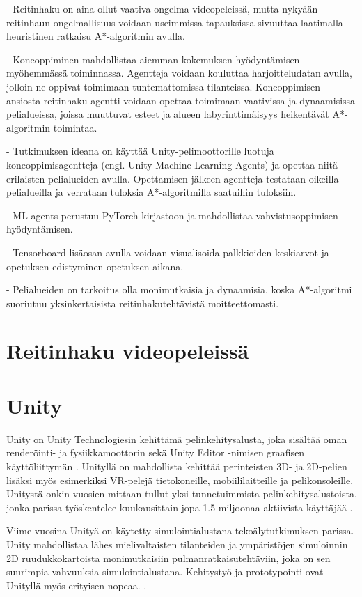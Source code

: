 \documentclass[utf8]{gradu3}
\begin{document}
- Reitinhaku on aina ollut vaativa ongelma videopeleissä, mutta nykyään reitinhaun ongelmallisuus voidaan
useimmissa tapauksissa sivuuttaa laatimalla heuristinen ratkaisu A*-algoritmin avulla.

- Koneoppiminen mahdollistaa aiemman kokemuksen hyödyntämisen myöhemmässä toiminnassa.
Agentteja voidaan kouluttaa harjoitteludatan avulla, jolloin ne oppivat toimimaan tuntemattomissa tilanteissa.
Koneoppimisen ansiosta reitinhaku-agentti voidaan opettaa toimimaan vaativissa ja
dynaamisissa pelialueissa, joissa muuttuvat esteet ja alueen labyrinttimäisyys
heikentävät A*-algoritmin toimintaa.

- Tutkimuksen ideana on käyttää Unity-pelimoottorille luotuja koneoppimisagentteja (engl. Unity Machine Learning Agents)
ja opettaa niitä erilaisten pelialueiden avulla. Opettamisen jälkeen agentteja testataan oikeilla
pelialueilla ja verrataan tuloksia A*-algoritmilla saatuihin tuloksiin.

- ML-agents perustuu PyTorch-kirjastoon ja mahdollistaa vahvistusoppimisen hyödyntämisen.

- Tensorboard-lisäosan avulla voidaan visualisoida palkkioiden keskiarvot ja opetuksen edistyminen opetuksen aikana.

- Pelialueiden on tarkoitus olla monimutkaisia ja dynaamisia, koska A*-algoritmi suoriutuu
yksinkertaisista reitinhakutehtävistä moitteettomasti.

\chapter{Reitinhaku videopeleissä}



\chapter{Unity}

Unity on Unity Technologiesin kehittämä pelinkehitysalusta, joka sisältää oman renderöinti- ja fysiikkamoottorin sekä Unity Editor -nimisen graafisen käyttöliittymän \parencite{juliani2018unity}. Unityllä on mahdollista kehittää perinteisten 3D- ja 2D-pelien lisäksi myös esimerkiksi VR-pelejä tietokoneille, mobiililaitteille ja pelikonsoleille. Unitystä onkin vuosien mittaan tullut yksi tunnetuimmista pelinkehitysalustoista, jonka parissa työskentelee kuukausittain jopa 1.5 miljoonaa aktiivista käyttäjää \parencite{unityweb}.

Viime vuosina Unityä on käytetty simulointialustana tekoälytutkimuksen parissa. Unity mahdollistaa lähes mielivaltaisten tilanteiden ja ympäristöjen simuloinnin 2D ruudukkokartoista monimutkaisiin pulmanratkaisutehtäviin, joka on sen suurimpia vahvuuksia simulointialustana. Kehitystyö ja prototypointi ovat Unityllä myös erityisen nopeaa. \parencite{juliani2018unity}.
\end{document}
